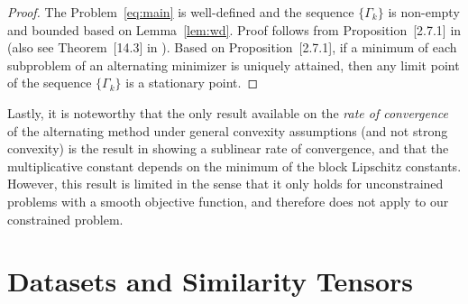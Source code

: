 \documentclass{article}
\begin{document}
 \begin{proof}
 The Problem~\eqref{eq:main} is well-defined and the sequence $\{\Gamma_k\}$ is non-empty and bounded based on Lemma~\eqref{lem:wd}. Proof follows from Proposition~{[2.7.1]} in \cite{bertsekas1999nonlinear} (also see Theorem~{[14.3]} in \cite{beck2017first}). Based on Proposition~{[2.7.1]}, if a minimum of each subproblem of an alternating minimizer is uniquely attained, then any limit point of the sequence $\{\Gamma_k\}$ is a stationary point.
\end{proof}


Lastly, it is noteworthy that the only result available on the \emph{rate of convergence}
of the alternating method under general convexity assumptions (and not strong convexity) is the result
in \cite{beck2013convergence} showing a sublinear rate of convergence, and that the multiplicative constant depends
on the minimum of the block Lipschitz constants. However, this result is limited in
the sense that it only holds for unconstrained problems with a smooth objective function, and therefore does not apply to our constrained problem. 




\section{Datasets and Similarity Tensors}\label{sec:data}

 
\end{document}
